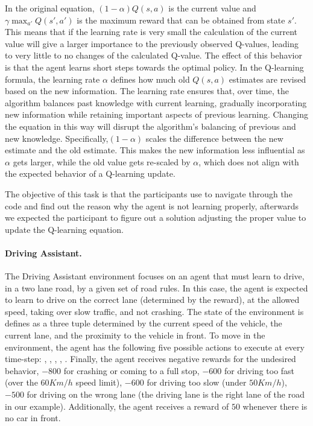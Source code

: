 In the original equation, $(1-\alpha) Q(s, a)$ is the current value and $\gamma \max_{a'} Q(s', a')$ 
is the maximum reward that can be obtained from state $s'$. This means that if the learning rate is 
very small the calculation of the current value will give a larger importance to the previously observed 
Q-values, leading to very little to no changes of the calculated Q-value. The effect of this behavior is 
that the agent learns short steps towards the optimal policy. In the Q-learning formula, the learning rate 
$\alpha$ defines how much old $Q(s,a)$ estimates are revised based on the new information. The 
learning rate ensures that, over time, the algorithm balances past knowledge with current learning, 
gradually incorporating new information while retaining important aspects of previous learning. 
Changing the equation in this way will disrupt the algorithm's balancing of previous and new 
knowledge. Specifically,$(1-\alpha)$ scales the difference between the new estimate and the old 
estimate. This makes the new information less influential as $\alpha$ gets larger, while the old value 
gets re-scaled by $\alpha$,  which does not align with the expected behavior of a Q-learning update. 

The objective of this task is that the participants use \flik to navigate through the code and find out 
the reason why the agent is not learning properly, afterwards we expected the participant to figure out
 a solution adjusting the proper value to update the Q-learning equation.

\paragraph{\textbf{Driving Assistant.}} 
The Driving Assistant environment focuses on an agent that must learn to drive, in a two lane road, by 
a given set of road rules. In this case, the agent is expected to learn to drive on the correct lane 
(determined by the reward), at the allowed speed, taking over slow traffic, and not crashing. 
The state of the environment is defines as a three tuple determined by the current speed of the vehicle, 
the current lane, and the proximity to the vehicle in front. To move in the environment, the agent has 
the following five possible actions to execute at every time-step: , 
, , , . Finally, the agent receives  
negative rewards for the undesired behavior, $-800$ for crashing or coming to a full stop, $-600$ for 
driving too fast (over the $60Km/h$ speed limit), $-600$ for driving too slow (under $50Km/h$), 
$-500$ for driving on the wrong lane (the driving lane is the right lane of the road in our example). 
Additionally, the agent receives a reward of $50$ whenever there is no car in front.

